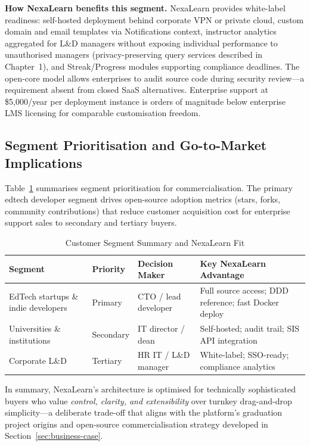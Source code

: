 \textbf{How NexaLearn benefits this segment.} NexaLearn provides white-label readiness: self-hosted deployment behind corporate VPN or private cloud, custom domain and email templates via Notifications context, instructor analytics aggregated for L\&D managers without exposing individual performance to unauthorised managers (privacy-preserving query services described in Chapter~1), and Streak/Progress modules supporting compliance deadlines. The open-core model allows enterprises to audit source code during security review---a requirement absent from closed SaaS alternatives. Enterprise support at \$5,000/year per deployment instance is orders of magnitude below enterprise LMS licensing for comparable customisation freedom.

\subsection{Segment Prioritisation and Go-to-Market Implications}
\label{subsec:segment-prioritisation}

Table~\ref{tab:segment-summary} summarises segment prioritisation for commercialisation. The primary edtech developer segment drives open-source adoption metrics (stars, forks, community contributions) that reduce customer acquisition cost for enterprise support sales to secondary and tertiary buyers.

\begin{table}[H]
  \centering
  \caption{Customer Segment Summary and NexaLearn Fit}
  \label{tab:segment-summary}
  \small
  \begin{tabular}{@{}p{2.4cm} p{2.2cm} p{3.5cm} p{4.8cm}@{}}
    \toprule
    \textbf{Segment} & \textbf{Priority} & \textbf{Decision Maker} & \textbf{Key NexaLearn Advantage} \\
    \midrule
    EdTech startups \& indie developers &
    Primary &
    CTO / lead developer &
    Full source access; DDD reference; fast Docker deploy \\
    \addlinespace
    Universities \& institutions &
    Secondary &
    IT director / dean &
    Self-hosted; audit trail; SIS API integration \\
    \addlinespace
    Corporate L\&D &
    Tertiary &
    HR IT / L\&D manager &
    White-label; SSO-ready; compliance analytics \\
    \bottomrule
  \end{tabular}
\end{table}

In summary, NexaLearn's architecture is optimised for technically sophisticated buyers who value \textit{control, clarity, and extensibility} over turnkey drag-and-drop simplicity---a deliberate trade-off that aligns with the platform's graduation project origins and open-source commercialisation strategy developed in Section~\ref{sec:business-case}.
